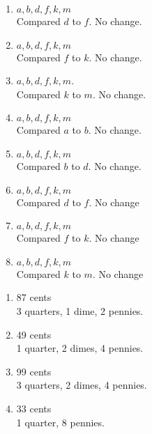 \documentclass[12pt]{article}  %
\begin{document}
\begin{enumerate}
    \item $a,b,d,f,k,m$\\
    Compared $d$ to $f$. No change.
    \item $a,b,d,f,k,m$\\
    Compared $f$ to $k$. No change.
    \item $a,b,d,f,k,m$.\\
    Compared $k$ to $m$. No change.
    \item $a,b,d,f,k,m$\\
    Compared $a$ to $b$. No change.
    \item $a,b,d,f,k,m$\\
    Compared $b$ to $d$. No change.
    \item $a,b,d,f,k,m$\\
    Compared $d$ to $f$. No change
    \item $a,b,d,f,k,m$\\
    Compared $f$ to $k$. No change
    \item $a,b,d,f,k,m$\\
    Compared $k$ to $m$. No change
\end{enumerate}

\begin{enumerate}
    \item 87 cents\\
    3 quarters, 1 dime, 2 pennies.
    \item 49 cents\\
    1 quarter, 2 dimes, 4 pennies.
    \item 99 cents\\
    3 quarters, 2 dimes, 4 pennies.
    \item 33 cents\\
    1 quarter, 8 pennies.
\end{enumerate}
\end{document}
